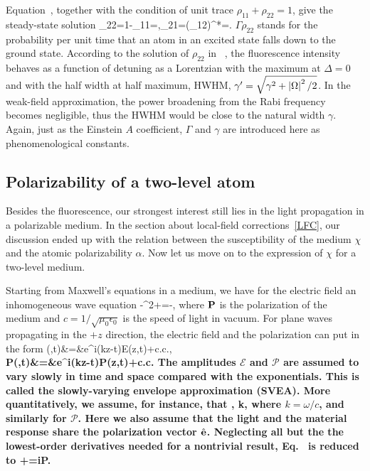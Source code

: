 Equation~, together with the condition of unit trace $\rho_{11}+\rho_{22}=1$, give the steady-state solution
\bea
\rho_{22}=1-\rho_{11}=,\quad\rho_{21}=(\rho_{12})^*=.
\label{STEADY_STATE}
\eea
$\Gamma\rho_{22}$ stands for the probability per unit time that an atom in an excited state falls down to the ground state. According to the solution of $\rho_{22}$ in ~, the fluorescence intensity behaves as a function of detuning as a Lorentzian with the maximum at $\Delta=0$ and with the half width at half maximum, HWHM, $\gamma^\prime=\sqrt{\gamma^2+\left| \Omega \right|^2/2}$.  In the weak-field approximation, the power broadening from the Rabi frequency becomes negligible, thus the HWHM would be close to the natural width $\gamma$. Again, just as the Einstein $A$ coefficient, $\Gamma$  and $\gamma$ are introduced here as phenomenological constants.
\subsection{Polarizability of a two-level atom}
Besides the fluorescence, our strongest interest still lies in the light propagation in a polarizable medium. In the section about local-field corrections~\ref{LFC}, our discussion ended up with the relation between the susceptibility of the medium $\chi$ and the atomic polarizability $\alpha$. Now let us move on to the expression of $\chi$ for a two-level medium.

Starting from Maxwell's equations in a medium, we have for the electric field an inhomogeneous wave equation
\bea
-\nabla^2\bE+=-,
\label{WAVE_EQ}
\eea
where $\bf P$ is the polarization of the medium and $c=1/\sqrt{\mu_0\epsilon_0}$ is the speed of light in vacuum. For plane waves propagating in the $+z$ direction, the electric field and the polarization can put in the form
\bea
\bE(\br,t)&=&e^{i(kz-\omega t)}\mathcal E(z,t)+{\rm c.c}.,\\
\bf P(\br,t)&=&e^{i(kz-\omega t)}\mathcal P(z,t)+{\rm c.c.}
\eea
The amplitudes $\mathcal E$ and $\mathcal P$ are assumed to vary slowly in time and space compared with the exponentials. This is called the slowly-varying envelope approximation (SVEA). More quantitatively, we assume, for  instance, that
\bea
{}\ll \omega{}, \quad {}\ll k, 
\eea
where $k=\omega/c$, and similarly for $\mathcal P$. Here we also assume that the light and the material response share the polarization vector $\hat{\bf e}$. Neglecting all but the the lowest-order derivatives needed for a nontrivial result, Eq.~ is reduced to 
\bea
{}+=i\mathcal P.
\label{BASIC_EQ}
\eea

